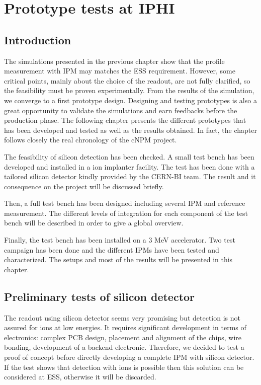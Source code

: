 \chapter{Prototype tests at IPHI}
\cleardoublepage

\minitoc

\section{Introduction}
\begin{refsection}
  \label{ch4:Introduction}
  The simulations presented in the previous chapter show that the profile measurement with IPM may matches the ESS requirement. However, some critical points, mainly about the choice of the readout, are not fully clarified, so the feasibility must be proven experimentally. From the results of the simulation, we converge to a first prototype design. Designing and testing prototypes is also a great opportunity to validate the simulations and earn feedbacks before the production phase. The following chapter presents the different prototypes that has been developed and tested as well as the results obtained. In fact, the chapter follows closely the real chronology of the cNPM project.

  The feasibility of silicon detection has been checked. A small test bench has been developed and installed in a ion implanter facility. The test has been done with a tailored silicon detector kindly provided by the CERN-BI team. The result and it consequence on the project will be discussed briefly.

  Then, a full test bench has been designed including several IPM and reference measurement. The different levels of integration for each component of the test bench will be described in order to give a global overview.
  
  Finally, the test bench has been installed on a 3 MeV accelerator. Two test campaign has been done and the different IPMs have been tested and characterized. The setups and most of the results will be presented in this chapter.

  \section{Preliminary tests of silicon detector}
  The readout using silicon detector seems very promising but detection is not assured for ions at low energies. It requires significant development in terms of electronics: complex PCB design, placement and alignment of the chips, wire bonding, development of a backend electronic. Therefore, we decided to test a proof of concept before directly developing a complete IPM with silicon detector. If the test shows that detection with ions is possible then this solution can be considered at ESS, otherwise it will be discarded.


\end{refsection}
